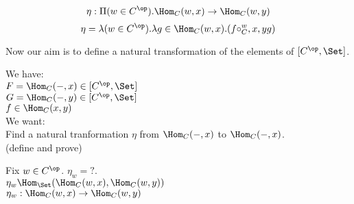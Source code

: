 \documentclass[10pt,a4paper]{article}
\begin{document}
\begin{definition}
$$\eta : \Pi(w\in C^\op).\Hom_C(w,x)\to \Hom_C(w,y)$$
$$\eta = \lambda (w\in C^\op). \lambda g\in\Hom_C(w,x).(f\circ_C^w,x,y g)$$
\end{definition}
Now our aim is to define a natural transformation of the elements of $[C^\op,\Set]$.\\
\begin{lemma}$\textrm{ }$\\
We have:\\
$F=\Hom_C(-,x)\in [C^\op,\Set]$\\
$G=\Hom_C(-,y)\in [C^\op,\Set]$\\
$f\in\Hom_C(x,y)$\\
We want:\\
Find a natural tranformation $\eta$ from $\Hom_C(-,x)$ to $\Hom_C(-,x)$.\\ (define and prove)\\
\end{lemma}
Fix $w\in C^\op$. $\eta_w = ?$.\\
$\eta_w\Hom_\Set(\Hom_C(w,x),\Hom_C(w,y))$\\
$\eta_w: \Hom_C(w,x)\to \Hom_C(w,y)$\\
\end{document}
